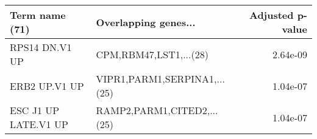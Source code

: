 \begin{tabular}{llr}
\toprule
      Term name (71) &         Overlapping genes... &  Adjusted p-value \\
\midrule
      RPS14 DN.V1 UP &       CPM,RBM47,LST1,...(28) &          2.64e-09 \\
       ERB2 UP.V1 UP & VIPR1,PARM1,SERPINA1,...(25) &          1.04e-07 \\
ESC J1 UP LATE.V1 UP &   RAMP2,PARM1,CITED2,...(25) &          1.04e-07 \\
\bottomrule
\end{tabular}
